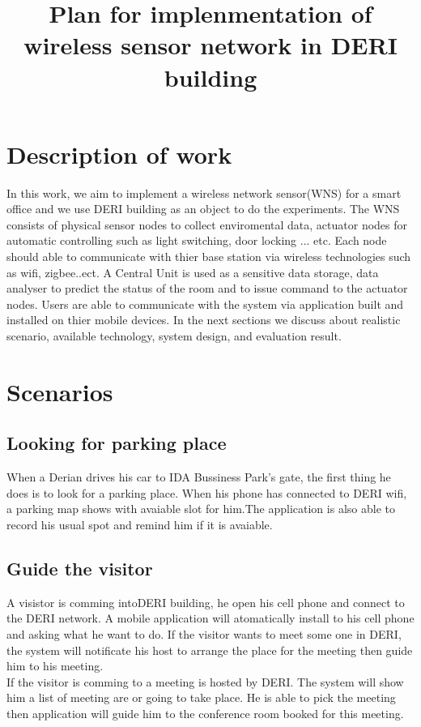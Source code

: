 \documentclass[a4paper, 12pt]{article}
\begin{document}
\title{Plan for implenmentation of wireless sensor network in DERI building}
\maketitle
\section{Description of work}
In this work, we aim to implement a wireless network sensor(WNS) for a smart office and we use DERI building as an object to do the experiments. The WNS consists of physical sensor nodes to collect enviromental data, actuator nodes for automatic controlling such as light switching, door locking ... etc.  Each node should able to communicate with thier base station via wireless technologies such as wifi, zigbee..ect. A Central Unit is used as a sensitive data storage, data analyser to predict the status of the room and to  issue command to the actuator nodes. Users are able to communicate with the system via application built and installed on thier mobile devices. In the next sections we discuss about realistic scenario, available technology, system design, and evaluation result.
\section{Scenarios}
\subsection{Looking for parking place}
 When a Derian drives his car to IDA Bussiness Park's gate, the first thing he does is to look for a parking place. When his phone has connected to DERI wifi, a parking map shows with avaiable slot for him.The application is also able to record his usual spot and remind him if it is avaiable.
\subsection{Guide the visitor}
 A visistor is comming intoDERI building, he open his cell phone and connect to the DERI network. A mobile application will atomatically install to his cell phone and asking what he want to do. 
 If the visitor wants to meet some one in DERI, the system will notificate his host to arrange the place for the meeting then guide him to his meeting.\\
 If the visitor is comming to a meeting is hosted by DERI. The system will show him a list of meeting are or going to take place. He is able to pick the meeting then application will guide him to the conference room booked for this meeting.
\end{document}
